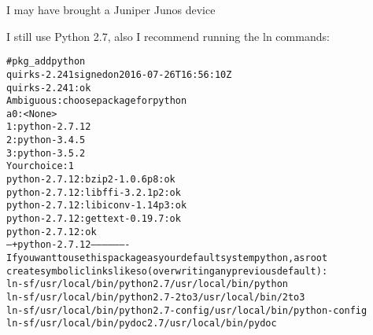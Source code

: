 \documentclass[18pt,landscape,a4paper,footrule]{foils}
\begin{document}
I may have brought a Juniper Junos device\\


I still use Python 2.7, also I recommend running the ln commands:
\begin{alltt}\footnotesize
# pkg_add python
quirks-2.241 signed on 2016-07-26T16:56:10Z
quirks-2.241: ok
Ambiguous: choose package for python
a       0: <None>
        1: python-2.7.12
        2: python-3.4.5
        3: python-3.5.2
Your choice: 1
python-2.7.12:bzip2-1.0.6p8: ok
python-2.7.12:libffi-3.2.1p2: ok
python-2.7.12:libiconv-1.14p3: ok
python-2.7.12:gettext-0.19.7: ok
python-2.7.12: ok
--- +python-2.7.12 -------------------
If you want to use this package as your default system python, as root
create symbolic links like so (overwriting any previous default):
 ln -sf /usr/local/bin/python2.7 /usr/local/bin/python
 ln -sf /usr/local/bin/python2.7-2to3 /usr/local/bin/2to3
 ln -sf /usr/local/bin/python2.7-config /usr/local/bin/python-config
 ln -sf /usr/local/bin/pydoc2.7  /usr/local/bin/pydoc
\end{alltt}
\end{document}
